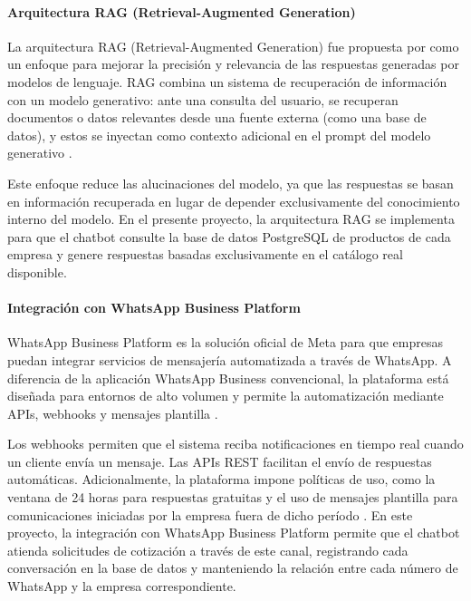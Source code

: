\paragraph{Arquitectura RAG (Retrieval-Augmented Generation)}

La arquitectura RAG (Retrieval-Augmented Generation) fue propuesta por \cite{lewis2020retrieval} como un enfoque para mejorar la precisión y relevancia de las respuestas generadas por modelos de lenguaje. RAG combina un sistema de recuperación de información con un modelo generativo: ante una consulta del usuario, se recuperan documentos o datos relevantes desde una fuente externa (como una base de datos), y estos se inyectan como contexto adicional en el prompt del modelo generativo \cite{gao2023retrieval}.

Este enfoque reduce las alucinaciones del modelo, ya que las respuestas se basan en información recuperada en lugar de depender exclusivamente del conocimiento interno del modelo. En el presente proyecto, la arquitectura RAG se implementa para que el chatbot consulte la base de datos PostgreSQL de productos de cada empresa y genere respuestas basadas exclusivamente en el catálogo real disponible.

\paragraph{Integración con WhatsApp Business Platform}

WhatsApp Business Platform es la solución oficial de Meta para que empresas puedan integrar servicios de mensajería automatizada a través de WhatsApp. A diferencia de la aplicación WhatsApp Business convencional, la plataforma está diseñada para entornos de alto volumen y permite la automatización mediante APIs, webhooks y mensajes plantilla \cite{meta2024whatsapp}.

Los webhooks permiten que el sistema reciba notificaciones en tiempo real cuando un cliente envía un mensaje. Las APIs REST facilitan el envío de respuestas automáticas. Adicionalmente, la plataforma impone políticas de uso, como la ventana de 24 horas para respuestas gratuitas y el uso de mensajes plantilla para comunicaciones iniciadas por la empresa fuera de dicho período \cite{meta2024whatsapp}. En este proyecto, la integración con WhatsApp Business Platform permite que el chatbot atienda solicitudes de cotización a través de este canal, registrando cada conversación en la base de datos y manteniendo la relación entre cada número de WhatsApp y la empresa correspondiente.

